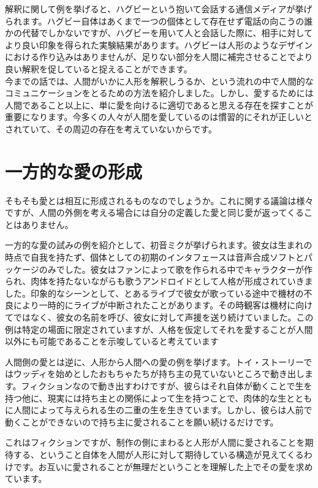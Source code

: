 \documentclass[b5j,twoside,twocolumn]{utarticle}
\begin{document}
解釈に関して例を挙げると、ハグビーという抱いて会話する通信メディアが挙げられます。ハグビー自体はあくまで一つの個体として存在せず電話の向こうの誰かの代替でしかないですが、ハグビーを用いて人と会話した際に、相手に対してより良い印象を得られた実験結果があります。ハグビーは人形のようなデザインにおける作り込みはありませんが、足りない部分を人間に補完させることでより良い解釈を促していると捉えることができます。\\


今までの話では、人間がいかに人形を解釈しうるか、という流れの中で人間的なコミュニケーションをとるための方法を紹介しました。しかし、愛するためには人間であること以上に、単に愛を向けるに適切であると思える存在を探すことが重要になります。今多くの人々が人間を愛しているのは慣習的にそれが正しいとされていて、その周辺の存在を考えていないからです。


\section{一方的な愛の形成}
そもそも愛とは相互に形成されるものなのでしょうか。これに関する議論は様々ですが、人間の外側を考える場合には自分の定義した愛と同じ愛が返ってくることはありません。


一方的な愛の試みの例を紹介として、初音ミクが挙げられます。彼女は生まれの時点で自我を持たず、個体としての初期のインタフェースは音声合成ソフトとパッケージのみでした。彼女はファンによって歌を作られる中でキャラクターが作られ、肉体を持たないながらも歌うアンドロイドとして人格が形成されていきました。印象的なシーンとして、とあるライブで彼女が歌っている途中で機材の不良により一時的にライブが中断されたことがあります。その時観客は機材に向けてではなく、彼女の名前を呼び、彼女に対して声援を送り続けていました。この例は特定の場面に限定されていますが、人格を仮定してそれを愛することが人間以外にも可能であることを示唆していると考えています


人間側の愛とは逆に、人形から人間への愛の例を挙げます。トイ・ストーリーではウッディを始めとしたおもちゃたちが持ち主の見ていないところで動き出します。フィクションなので動き出すわけですが、彼らはそれ自体が動くことで生を持つ他に、現実には持ち主との関係によって生を持つことで、肉体的な生とともに人間によって与えられる生の二重の生を生きています。しかし、彼らは人前で動くことができないので持ち主に愛されることを願い続けるだけです。


これはフィクションですが、制作の側にまわると人形が人間に愛されることを期待する、ということ自体を人間が人形に対して期待している構造が見えてくるわけです。お互いに愛されることが無理だということを理解した上でその愛を求めています。
\end{document}
